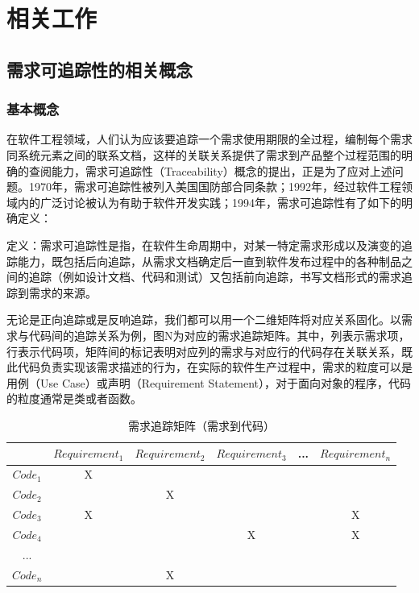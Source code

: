 \chapter{相关工作}

\section{需求可追踪性的相关概念}

\subsection{基本概念}

在软件工程领域，人们认为应该要追踪一个需求使用期限的全过程，编制每个需求同系统元素之间的联系文档，这样的关联关系提供了需求到产品整个过程范围的明确的查阅能力，需求可追踪性（Traceability）概念的提出，正是为了应对上述问题。1970年，需求可追踪性被列入美国国防部合同条款；1992年，经过软件工程领域内的广泛讨论被认为有助于软件开发实践；1994年，需求可追踪性有了如下的明确定义\cite{gotel1994analysis}：

定义：需求可追踪性是指，在软件生命周期中，对某一特定需求形成以及演变的追踪能力，既包括后向追踪，从需求文档确定后一直到软件发布过程中的各种制品之间的追踪（例如设计文档、代码和测试）又包括前向追踪，书写文档形式的需求追踪到需求的来源。

无论是正向追踪或是反响追踪，我们都可以用一个二维矩阵将对应关系固化。以需求与代码间的追踪关系为例，图N为对应的需求追踪矩阵。其中，列表示需求项，行表示代码项，矩阵间的标记表明对应列的需求与对应行的代码存在关联关系，既此代码负责实现该需求描述的行为，在实际的软件生产过程中，需求的粒度可以是用例（Use Case）或声明（Requirement Statement），对于面向对象的程序，代码的粒度通常是类或者函数。

\begin{table}[]
\centering
\caption{需求追踪矩阵（需求到代码）}
\label{my-label}
\begin{tabular}{@{}cccccc@{}}
\toprule
      & $Requirement_{1}$ & $Requirement_{2}$ & $Requirement_{3}$ & ... & $Requirement_{n}$ \\ \midrule
$Code_{1}$ & X            &              &              &     &              \\
$Code_{2}$ &              & X            &              &     &              \\
$Code_{3}$ & X            &              &              &     & X            \\
$Code_{4}$ &              &              & X            &     & X            \\
...   &              &              &              &     &              \\
$Code_{n}$ &              & X            &              &     &              \\ \bottomrule
\end{tabular}
\end{table}

